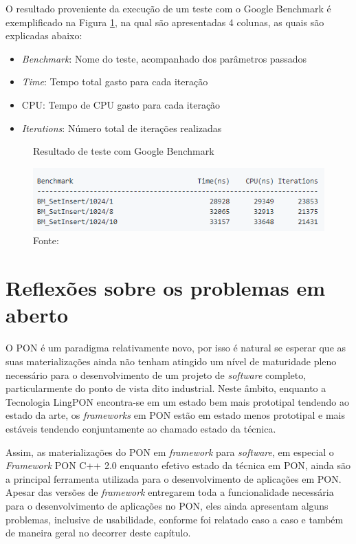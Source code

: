 O resultado proveniente da execução de um teste com o Google Benchmark é
exemplificado na Figura \ref{fig:google_bench_result}, na qual são apresentadas
4 colunas, as quais são explicadas abaixo:

\begin{itemize}
  \item \textit{Benchmark}: Nome do teste, acompanhado dos parâmetros passados
  \item \textit{Time}: Tempo total gasto para cada iteração
  \item CPU: Tempo de CPU gasto para cada iteração
  \item \textit{Iterations}: Número total de iterações realizadas
\end{itemize}

\begin{figure}[!htb]
  \centering
  \caption{Resultado de teste com Google Benchmark}
  \includegraphics[width=.8\textwidth]{../figures/google_bench_result.png}
  \caption*{Fonte: }
  \label{fig:google_bench_result}
\end{figure}

\section{Reflexões sobre os problemas em aberto}\label{sec:problemas}

O PON é um paradigma relativamente novo, por isso é natural se esperar que as
suas materializações ainda não tenham atingido um nível de maturidade pleno
necessário para o desenvolvimento de um projeto de \textit{software} completo,
particularmente do ponto de vista dito industrial. Neste âmbito, enquanto a
Tecnologia LingPON encontra-se em um estado bem mais prototipal tendendo ao
estado da arte, os \textit{frameworks} em PON estão em estado menos prototipal e
mais estáveis tendendo conjuntamente ao chamado estado da técnica. 

Assim, as materializações do PON em \textit{framework} para \textit{software},
em especial o \textit{Framework} PON C++ 2.0 enquanto efetivo estado da técnica
em PON, ainda são a principal ferramenta utilizada para o desenvolvimento de
aplicações em PON. Apesar das versões de \textit{framework} entregarem toda a
funcionalidade necessária para o desenvolvimento de aplicações no PON, eles
ainda apresentam alguns problemas, inclusive de usabilidade, conforme foi
relatado caso a caso e também de maneira geral no decorrer deste capítulo.

